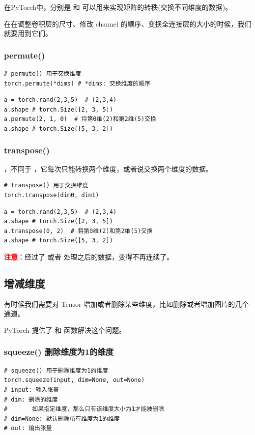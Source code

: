 在PyTorch中，分别是  和  可以用来实现矩阵的转秩(交换不同维度的数据)。

在在调整卷积层的尺寸、修改 channel 的顺序、变换全连接层的大小的时候，我们就要用到它们。
\subsubsection{permute() }
\label{subsubsec:Pytorch的permute()}
\begin{lstlisting}[style=demostyle,numbers=none]
# permute() 用于交换维度
torch.permute(*dims) # *dims: 交换维度的顺序
\end{lstlisting}

\begin{lstlisting}[style=pythonstyle]
a = torch.rand(2,3,5)  # (2,3,4)
a.shape # torch.Size([2, 3, 5])
a.permute(2, 1, 0)  # 将第0维(2)和第2维(5)交换
a.shape # torch.Size([5, 3, 2])
\end{lstlisting}

\subsubsection{transpose()}
\label{subsubsec:Pytorch的transpose()}
，不同于 ，它每次只能转换两个维度，或者说交换两个维度的数据。

\begin{lstlisting}[style=demostyle,numbers=none]
# transpose() 用于交换维度
torch.transpose(dim0, dim1)
\end{lstlisting}

\begin{lstlisting}[style=pythonstyle]
a = torch.rand(2,3,5)  # (2,3,4)
a.shape # torch.Size([2, 3, 5])
a.transpose(0, 2)  # 将第0维(2)和第2维(5)交换
a.shape # torch.Size([5, 3, 2])
\end{lstlisting}

\textcolor{red}{\textbf{注意}}：经过了  或者  处理之后的数据，变得不再连续了。

\subsection{增减维度}
\label{subsec:Pytorch增减维度}
有时候我们需要对 Tensor 增加或者删除某些维度，比如删除或者增加图片的几个通道。
    
PyTorch 提供了  和  函数解决这个问题。
\subsubsection{squeeze() 删除维度为1的维度}
\label{subsubsec:Pytorch的squeeze()}
\begin{lstlisting}[style=demostyle,numbers=none]
# squeeze() 用于删除维度为1的维度
torch.squeeze(input, dim=None, out=None)
# input: 输入张量
# dim: 删除的维度
#       如果指定维度，那么只有该维度大小为1才能被删除
# dim=None: 默认删除所有维度为1的维度
# out: 输出张量
\end{lstlisting}

